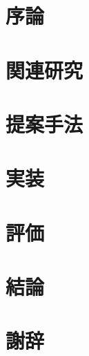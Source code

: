 \documentclass[12pt]{m-thesis}
\begin{document}





\pagestyle{headings}
\setcounter{page}{1}

\chapter{序論}
\label{chap:intro}


\chapter{関連研究}
\label{chap:related_work}


\chapter{提案手法}
\label{chap:design}


\chapter{実装}
\label{chap:implement}


\chapter{評価}
\label{chap:eval}


\chapter{結論}
\label{chap:conclusion}





% 
% 

\chapter*{謝辞}
\label{chap:acknowledgments}


% 
\end{document}
